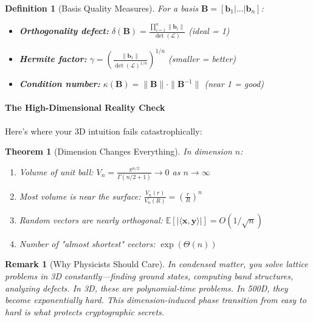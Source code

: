 \documentclass[11pt,a4paper]{article}
\newtheorem{definition}{Definition}
\newtheorem{theorem}{Theorem}
\newtheorem{remark}{Remark}
\begin{document}
\begin{definition}[Basis Quality Measures]
For a basis $\mathbf{B} = [\mathbf{b}_1 | ... | \mathbf{b}_n]$:
\begin{itemize}
    \item \textbf{Orthogonality defect:} $\delta(\mathbf{B}) = \frac{\prod_{i=1}^n \|\mathbf{b}_i\|}{\det(\mathcal{L})}$ (ideal = 1)
    \item \textbf{Hermite factor:} $\gamma = \left(\frac{\|\mathbf{b}_1\|}{\det(\mathcal{L})^{1/n}}\right)^{1/n}$ (smaller = better)
    \item \textbf{Condition number:} $\kappa(\mathbf{B}) = \|\mathbf{B}\| \cdot \|\mathbf{B}^{-1}\|$ (near 1 = good)
\end{itemize}
\end{definition}

\paragraph{The High-Dimensional Reality Check}

Here's where your 3D intuition fails catastrophically:

\begin{theorem}[Dimension Changes Everything]
In dimension $n$:
\begin{enumerate}
    \item Volume of unit ball: $V_n = \frac{\pi^{n/2}}{\Gamma(n/2 + 1)} \to 0$ as $n \to \infty$
    \item Most volume is near the surface: $\frac{V_n(r)}{V_n(R)} = \left(\frac{r}{R}\right)^n$
    \item Random vectors are nearly orthogonal: $\mathbb{E}[|\langle \mathbf{x}, \mathbf{y} \rangle|] = O(1/\sqrt{n})$
    \item Number of "almost shortest" vectors: $\exp(\Theta(n))$
\end{enumerate}
\end{theorem}

\begin{remark}[Why Physicists Should Care]
In condensed matter, you solve lattice problems in 3D constantly—finding ground states, computing band structures, analyzing defects. In 3D, these are polynomial-time problems. In 500D, they become exponentially hard. This dimension-induced phase transition from easy to hard is what protects cryptographic secrets.
\end{remark}
\end{document}
